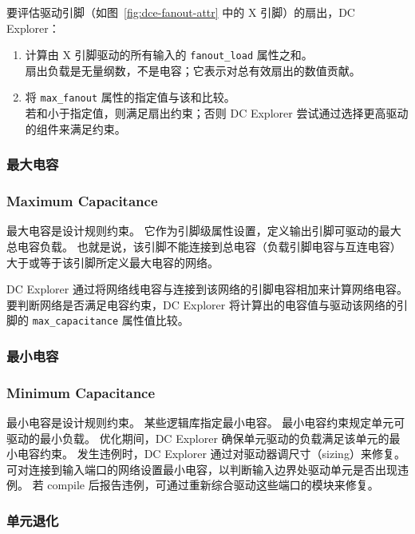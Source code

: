 
要评估驱动引脚（如图~\ref{fig:dce-fanout-attr} 中的 X 引脚）的扇出，DC Explorer：
\begin{enumerate}
  \item 计算由 X 引脚驱动的所有输入的 \texttt{fanout\_load} 属性之和。\\
        扇出负载是无量纲数，不是电容；它表示对总有效扇出的数值贡献。
  \item 将 \texttt{max\_fanout} 属性的指定值与该和比较。\\
        若和小于指定值，则满足扇出约束；否则 DC Explorer 尝试通过选择更高驱动的组件来满足约束。
\end{enumerate}

\subsubsection{最大电容}
\subsubsection*{Maximum Capacitance}

最大电容是设计规则约束。
它作为引脚级属性设置，定义输出引脚可驱动的最大总电容负载。
也就是说，该引脚不能连接到总电容（负载引脚电容与互连电容）大于或等于该引脚所定义最大电容的网络。

DC Explorer 通过将网络线电容与连接到该网络的引脚电容相加来计算网络电容。
要判断网络是否满足电容约束，DC Explorer 将计算出的电容值与驱动该网络的引脚的 \texttt{max\_capacitance} 属性值比较。

\subsubsection{最小电容}
\subsubsection*{Minimum Capacitance}

最小电容是设计规则约束。
某些逻辑库指定最小电容。
最小电容约束规定单元可驱动的最小负载。
优化期间，DC Explorer 确保单元驱动的负载满足该单元的最小电容约束。
发生违例时，DC Explorer 通过对驱动器调尺寸（sizing）来修复。
可对连接到输入端口的网络设置最小电容，以判断输入边界处驱动单元是否出现违例。
若 compile 后报告违例，可通过重新综合驱动这些端口的模块来修复。

\subsubsection{单元退化}
